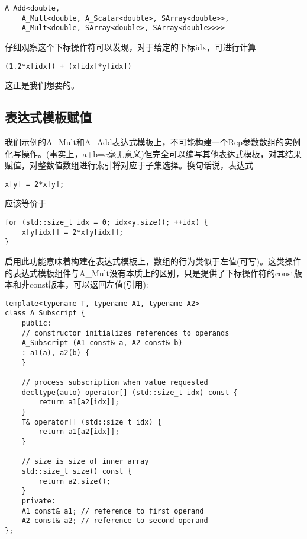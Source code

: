\begin{lstlisting}[style=styleCXX]
A_Add<double,
	A_Mult<double, A_Scalar<double>, SArray<double>>,
	A_Mult<double, SArray<double>, SArray<double>>>>
\end{lstlisting}

仔细观察这个下标操作符可以发现，对于给定的下标idx，可进行计算

\begin{lstlisting}[style=styleCXX]
(1.2*x[idx]) + (x[idx]*y[idx])
\end{lstlisting}

这正是我们想要的。

\subsection{表达式模板赋值}

我们示例的A\_Mult和A\_Add表达式模板上，不可能构建一个Rep参数数组的实例化写操作。(事实上，a+b=c毫无意义)但完全可以编写其他表达式模板，对其结果赋值，对整数值数组进行索引将对应于子集选择。换句话说，表达式

\begin{lstlisting}[style=styleCXX]
x[y] = 2*x[y];
\end{lstlisting}

应该等价于

\begin{lstlisting}[style=styleCXX]
for (std::size_t idx = 0; idx<y.size(); ++idx) {
	x[y[idx]] = 2*x[y[idx]];
}
\end{lstlisting}

启用此功能意味着构建在表达式模板上，数组的行为类似于左值(可写)。这类操作的表达式模板组件与A\_Mult没有本质上的区别，只是提供了下标操作符的const版本和非const版本，可以返回左值(引用):

\begin{lstlisting}[style=styleCXX]
template<typename T, typename A1, typename A2>
class A_Subscript {
	public:
	// constructor initializes references to operands
	A_Subscript (A1 const& a, A2 const& b)
	: a1(a), a2(b) {
	}

	// process subscription when value requested
	decltype(auto) operator[] (std::size_t idx) const {
		return a1[a2[idx]];
	}
	T& operator[] (std::size_t idx) {
		return a1[a2[idx]];
	}

	// size is size of inner array
	std::size_t size() const {
		return a2.size();
	}
	private:
	A1 const& a1; // reference to first operand
	A2 const& a2; // reference to second operand
};
\end{lstlisting}

